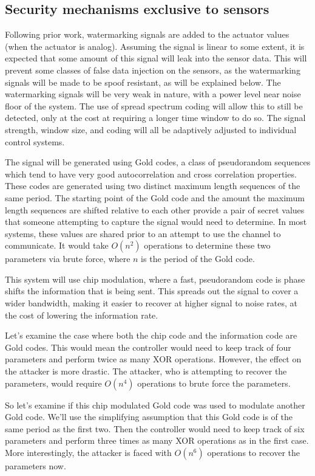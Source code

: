 \documentclass[10pt,twocolumn]{IEEEtran}
\begin{document}
\subsection{Security mechanisms exclusive to sensors}
Following prior work, watermarking signals are added to the actuator values (when the actuator is analog).
Assuming the signal is linear to some extent, it is expected that some amount of this signal will leak into the sensor data.
This will prevent some classes of false data injection on the sensors, as the watermarking signals will be made to be spoof resistant, as will be explained below.
The watermarking signals will be very weak in nature, with a power level near noise floor of the system.
The use of spread spectrum coding will allow this to still be detected, only at the cost at requiring a longer time window to do so.
The signal strength, window size, and coding will all be adaptively adjusted to individual control systems.

The signal will be generated using Gold codes, a class of pseudorandom sequences which tend to have very good autocorrelation and cross correlation properties.
These codes are generated using two distinct maximum length sequences of the same period.
The starting point of the Gold code and the amount the maximum length sequences are shifted relative to each other provide a pair of secret values that someone attempting to capture the signal would need to determine.
In most systems, these values are shared prior to an attempt to use the channel to communicate.
It would take $O(n^2)$ operations to determine these two parameters via brute force, where $n$ is the period of the Gold code.

This system will use chip modulation, where a fast, pseudorandom code is phase shifts the information that is being sent.
This spreads out the signal to cover a wider bandwidth, making it easier to recover at higher signal to noise rates, at the cost of lowering the information rate.

Let's examine the case where both the chip code and the information code are Gold codes.
This would mean the controller would need to keep track of four parameters and perform twice as many XOR operations.
However, the effect on the attacker is more drastic.
The attacker, who is attempting to recover the parameters, would require $O(n^4)$ operations to brute force the parameters.

So let's examine if this chip modulated Gold code was used to modulate another Gold code.
We'll use the simplifying assumption that this Gold code is of the same period as the first two.
Then the controller would need to keep track of six parameters and perform three times as many XOR operations as in the first case.
More interestingly, the attacker is faced with $O(n^6)$ operations to recover the parameters now.
\end{document}

